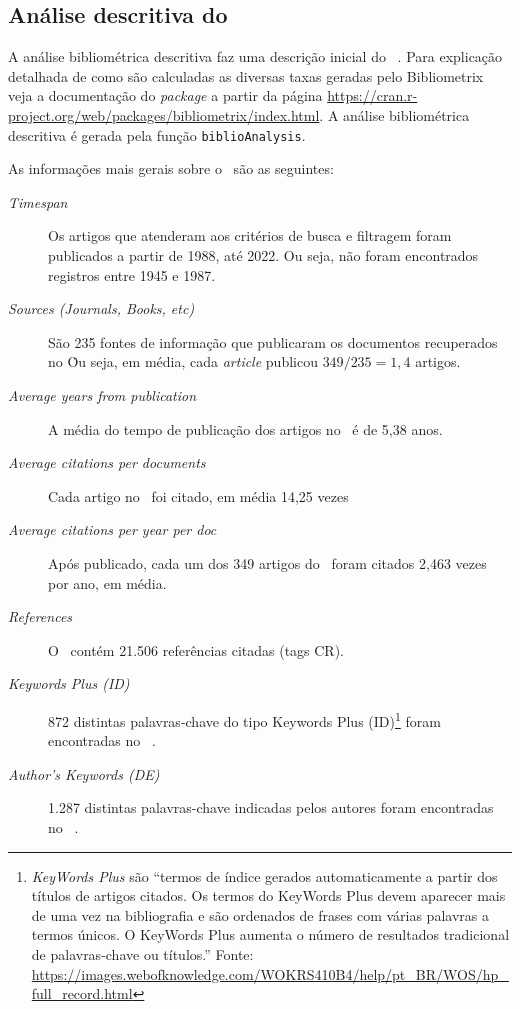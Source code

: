 \subsection{Análise descritiva do \dataset }

A análise bibliométrica descritiva faz uma descrição inicial do \dataset\  . Para explicação detalhada de como são calculadas as diversas taxas geradas pelo Bibliometrix veja a documentação do \textit{package} a partir da página \url{https://cran.r-project.org/web/packages/bibliometrix/index.html}. A análise bibliométrica descritiva é gerada pela função \texttt{biblioAnalysis}.

As informações mais gerais sobre o \dataset\ são as seguintes:
\begin{description}
    \item [\textit{Timespan}] Os artigos que atenderam aos critérios de busca e filtragem foram publicados a partir de 1988, até 2022. Ou seja, não foram encontrados registros entre 1945 e 1987.
    \item [\textit{Sources (Journals, Books, etc)}] São 235 fontes de informação que publicaram os documentos recuperados no \dataset\. Ou seja, em média, cada \textit{article} publicou $349/235=1,4$ artigos.
    \item [\textit{Average years from publication}] A média do tempo de publicação dos artigos no \dataset\ é de 5,38 anos.
    \item [\textit{Average citations per documents}] Cada artigo no \dataset\ foi citado, em média 14,25 vezes
    \item [\textit{Average citations per year per doc}] Após publicado, cada um dos 349 artigos do \dataset\   foram citados 2,463 vezes por ano, em média.
    \item [\textit{References}] O \dataset\ contém 21.506 referências citadas (tags CR).
    \item [\textit{Keywords Plus (ID)}] 872 distintas palavras-chave do tipo Keywords Plus (ID)\footnote{\textit{KeyWords Plus} são ``termos de índice gerados automaticamente a partir dos títulos de artigos citados. Os termos do KeyWords Plus devem aparecer mais de uma vez na bibliografia e são ordenados de frases com várias palavras a termos únicos. O KeyWords Plus aumenta o número de resultados tradicional de palavras-chave ou títulos.'' Fonte: \url{https://images.webofknowledge.com/WOKRS410B4/help/pt_BR/WOS/hp_full_record.html}} foram encontradas no \dataset\   . 
    \item [\textit{Author's Keywords (DE)}] 1.287 distintas palavras-chave indicadas pelos autores foram encontradas no \dataset\  .

\end{description}
